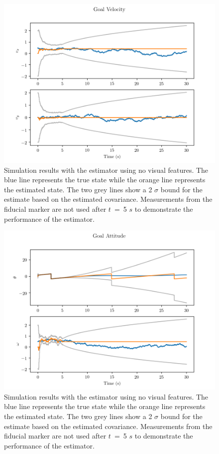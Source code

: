 \begin{figure}
  \centering
  \includegraphics[scale=0.5]{plots/no_lms_gv.png}
  \caption{Simulation results with the estimator using no visual
  features. The blue line represents the true state while the orange line
  represents the estimated state. The two grey lines show a 2 $\sigma$ bound for
  the estimate based on the estimated covariance. Measurements from the fiducial
  marker are not used after $t$~=~5
$s$ to demonstrate the performance of the estimator.}
  \label{fig:no_lms_gv}
\end{figure}

\begin{figure}
  \centering
  \includegraphics[scale=0.5]{plots/no_lms_gatt.png}
  \caption{Simulation results with the estimator using no visual
  features. The blue line represents the true state while the orange line
  represents the estimated state. The two grey lines show a 2 $\sigma$ bound for
  the estimate based on the estimated covariance. Measurements from the fiducial
  marker are not used after $t$~=~5
$s$ to demonstrate the performance of the estimator.}
  \label{fig:no_lms_gatt}
\end{figure}

